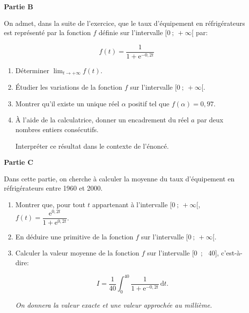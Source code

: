 \documentclass[10pt]{article}
\providecommand{\e}{{\mathrm{e}}}
\begin{document}
\medskip

\textbf{Partie B}

\medskip

On admet, dans la suite de l'exercice, que le taux d'équipement en réfrigérateurs est représenté par la fonction $f$ définie sur l'intervalle $[0~;~+\infty[$ par:

\[f(t) = \dfrac{1}{1+ \e^{-0,2t}}\]

\begin{enumerate}
\item Déterminer $\displaystyle\lim_{t \to + \infty} f(t)$.
\item Étudier les variations de la fonction $f$ sur l'intervalle $[0~;~+\infty[$.
\item Montrer qu'il existe un unique réel $\alpha$ positif tel que $f(\alpha) = 0,97$.
\item À l'aide de la calculatrice, donner un encadrement du réel $a$ par deux nombres entiers
consécutifs.

Interpréter ce résultat dans le contexte de l'énoncé.
\end{enumerate}

\medskip

\textbf{Partie C}

\medskip

Dans cette partie, on cherche à calculer la moyenne du taux d'équipement en réfrigérateurs entre 1960 et 2000.

\medskip

\begin{enumerate}
\item Montrer que, pour tout $t$ appartenant à l'intervalle $[0~;~+\infty[$,\: $f(t) = \dfrac{\e^{0,2t}}{1 + \e^{0,2t}}$.
\item En déduire une primitive de la fonction $f$ sur l'intervalle $[0~;~+\infty[$.
\item Calculer la valeur moyenne de la fonction $f$ sur l'intervalle [0~;~ 40], c'est-à-dire:

\[I = \dfrac{1}{40}\displaystyle\int_0^{40} \dfrac{1}{1 + \e^{-0,2t}}\,\text{d}t.\]

\emph{On donnera la valeur exacte et une valeur approchée au millième.}
\end{enumerate}
\end{document}
